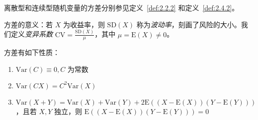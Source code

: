 \documentclass[../main.tex]{subfiles}
\begin{document}
离散型和连续型随机变量的方差分别参见定义~\ref{def:2.2.2} 和定义~\ref{def:2.4.2}。

方差的意义：若 $X$ 为收益率，则 $\mathrm{SD}(X)$ 称为\emph{波动率}，刻画了风险的大小。我们定义\emph{变异系数} $\mathrm{CV}=\frac{\mathrm{SD}(X)}{\mu}$，其中 $\mu=\mathrm E(X)\neq0$。

\begin{proposition}
    方差有如下性质：
    \begin{enumerate}
        \item $\mathrm{Var}(C)\equiv 0,C\text{ 为常数}$
        \item $\mathrm{Var}(CX)=C^2\mathrm{Var}(X)$
        \item $\mathrm{Var}(X+Y)=\mathrm{Var}(X)+\mathrm{Var}(Y)+2\mathrm{E}((X-\mathrm{E}(X))(Y-\mathrm{E}(Y)))$，且若 $X,Y$ 独立，则 $\mathrm{E}((X-\mathrm{E}(X))(Y-\mathrm{E}(Y)))=0$
    \end{enumerate}
\end{proposition}
\end{document}

